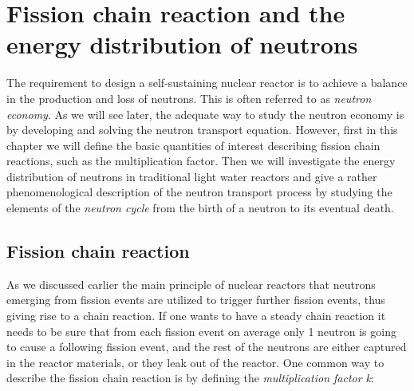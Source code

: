 % 
%
% 
%
%
%
%
%

\section{Fission chain reaction and the energy distribution of neutrons}

The requirement to design a self-sustaining nuclear reactor is to achieve a balance in the production and loss of neutrons. This is often referred to as \textit{neutron economy}. As we will see later, the adequate way to study the neutron economy is by developing and solving the neutron transport equation. However, first in this chapter we will define the basic quantities of interest describing fission chain reactions, such as the multiplication factor. Then we will investigate the energy distribution of neutrons in traditional light water reactors and give a rather phenomenological description of the neutron transport process by studying the elements of the \textit{neutron cycle} from the birth of a neutron to its eventual death.


\subsection{Fission chain reaction}

As we discussed earlier the main principle of nuclear reactors that neutrons emerging from fission events are utilized to trigger further fission events, thus giving rise to a chain reaction. If one wants to have a steady chain reaction it needs to be sure that from each fission event on average only 1 neutron is going to cause a following fission event, and the rest of the neutrons are either captured in the reactor materials, or they leak out of the reactor. One common way to describe the fission chain reaction is by defining the \textit{multiplication factor k}:

